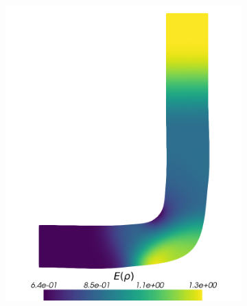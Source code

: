 \begin{figure}[H]
	\centering
	\begin{subfigure}{0.31\linewidth}
		\centering
		\includegraphics[width=\linewidth]{figs/pipe/pipe_sc_ref_n50_E(rho).png}
		\caption{}
		\label{fig:referenceSolutionsPipe1}
	\end{subfigure}%
	\hfill
	\begin{subfigure}{0.31\linewidth}
		\centering

\end{subfigure}
\end{figure}
